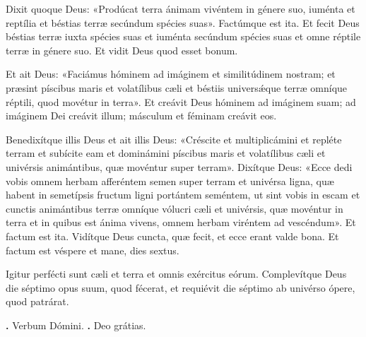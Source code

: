 Dixit quoque Deus: «Prodúcat terra ánimam vivéntem in génere suo, iuménta et reptília et béstias terræ secúndum spécies suas».
Factúmque est ita. Et fecit Deus béstias terræ iuxta spécies suas et iuménta secúndum spécies suas et omne réptile terræ in génere suo. Et vidit Deus quod esset bonum.

Et ait Deus: «Faciámus hóminem ad imáginem et similitúdinem nostram; et præsint píscibus maris et volatílibus cæli et béstiis univers\'{\ae}que terræ omníque réptili, quod movétur in terra».
Et creávit Deus hóminem ad imáginem suam; ad imáginem Dei creávit illum; másculum et féminam creávit eos. 

Benedixítque illis Deus et ait illis Deus: «Créscite et multiplicámini et repléte terram et subícite eam et dominámini píscibus maris et volatílibus cæli et univérsis animántibus, quæ movéntur super terram».
Dixítque Deus: «Ecce dedi vobis omnem herbam afferéntem semen super terram et univérsa ligna, quæ habent in semetípsis fructum ligni portántem seméntem, ut sint vobis in escam et cunctis animántibus terræ omníque vólucri cæli et univérsis, quæ movéntur in terra et in quibus est ánima vivens, omnem herbam viréntem ad vescéndum». Et factum est ita.
Vidítque Deus cuncta, quæ fecit, et ecce erant valde bona. Et factum est véspere et mane, dies sextus.

Igitur perfécti sunt cæli et terra et omnis exércitus eórum. 
Complevítque Deus die séptimo opus suum, quod fécerat, et requiévit die séptimo
ab univérso ópere, quod patrárat.

\textbf{\Vbar.} Verbum Dómini.
\textbf{\Rbar.} Deo grátias.
\par